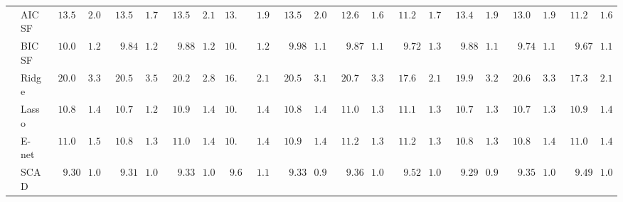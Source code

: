 \begin{tabular}{ll|ll|llllll|llllll|llllll}
 & AIC SF  & $\phantom{0}13.56$ & $\phantom{0}2.04$ & $\phantom{0}13.56$ & $\phantom{0}1.73$ & $\phantom{0}13.54$ & $\phantom{0}2.11$ & $13.55$ & $\phantom{0}1.96$ & $\phantom{0}13.59$ & $\phantom{0}2.06$ & $\phantom{0}12.68$ & $\phantom{0}1.64$ & $\phantom{0}11.25$ & $\phantom{0}1.70$ & $\phantom{0}13.40$ & $\phantom{0}1.98$ & $\phantom{0}13.00$ & $\phantom{0}1.93$ & $\phantom{0}11.20$ & $\phantom{0}1.69$ \\
 & BIC SF  & $\phantom{0}10.00$ & $\phantom{0}1.21$ & $\phantom{00}9.84$ & $\phantom{0}1.24$ & $\phantom{00}9.88$ & $\phantom{0}1.21$ & $10.08$ & $\phantom{0}1.25$ & $\phantom{00}9.98$ & $\phantom{0}1.13$ & $\phantom{00}9.87$ & $\phantom{0}1.10$ & $\phantom{00}9.72$ & $\phantom{0}1.33$ & $\phantom{00}9.88$ & $\phantom{0}1.17$ & $\phantom{00}9.74$ & $\phantom{0}1.11$ & $\phantom{00}9.67$ & $\phantom{0}1.15$ \\
 & Ridge  & $\phantom{0}20.09$ & $\phantom{0}3.38$ & $\phantom{0}20.56$ & $\phantom{0}3.56$ & $\phantom{0}20.27$ & $\phantom{0}2.80$ & $16.79$ & $\phantom{0}2.15$ & $\phantom{0}20.53$ & $\phantom{0}3.12$ & $\phantom{0}20.70$ & $\phantom{0}3.32$ & $\phantom{0}17.67$ & $\phantom{0}2.17$ & $\phantom{0}19.91$ & $\phantom{0}3.20$ & $\phantom{0}20.68$ & $\phantom{0}3.36$ & $\phantom{0}17.35$ & $\phantom{0}2.13$ \\
 & Lasso  & $\phantom{0}10.87$ & $\phantom{0}1.47$ & $\phantom{0}10.70$ & $\phantom{0}1.27$ & $\phantom{0}10.91$ & $\phantom{0}1.43$ & $10.65$ & $\phantom{0}1.41$ & $\phantom{0}10.83$ & $\phantom{0}1.46$ & $\phantom{0}11.05$ & $\phantom{0}1.33$ & $\phantom{0}11.11$ & $\phantom{0}1.35$ & $\phantom{0}10.72$ & $\phantom{0}1.33$ & $\phantom{0}10.73$ & $\phantom{0}1.36$ & $\phantom{0}10.96$ & $\phantom{0}1.47$ \\
 & E-net  & $\phantom{0}11.02$ & $\phantom{0}1.51$ & $\phantom{0}10.83$ & $\phantom{0}1.31$ & $\phantom{0}11.02$ & $\phantom{0}1.41$ & $10.74$ & $\phantom{0}1.42$ & $\phantom{0}10.94$ & $\phantom{0}1.49$ & $\phantom{0}11.20$ & $\phantom{0}1.37$ & $\phantom{0}11.20$ & $\phantom{0}1.34$ & $\phantom{0}10.85$ & $\phantom{0}1.35$ & $\phantom{0}10.84$ & $\phantom{0}1.40$ & $\phantom{0}11.08$ & $\phantom{0}1.48$ \\
 & SCAD  & $\phantom{00}9.30$ & $\phantom{0}1.06$ & $\phantom{00}9.31$ & $\phantom{0}1.02$ & $\phantom{00}9.33$ & $\phantom{0}1.05$ & $\phantom{0}9.60$ & $\phantom{0}1.14$ & $\phantom{00}9.33$ & $\phantom{0}0.97$ & $\phantom{00}9.36$ & $\phantom{0}1.04$ & $\phantom{00}9.52$ & $\phantom{0}1.05$ & $\phantom{00}9.29$ & $\phantom{0}0.99$ & $\phantom{00}9.35$ & $\phantom{0}1.03$ & $\phantom{00}9.49$ & $\phantom{0}1.08$ \\

\end{tabular}
